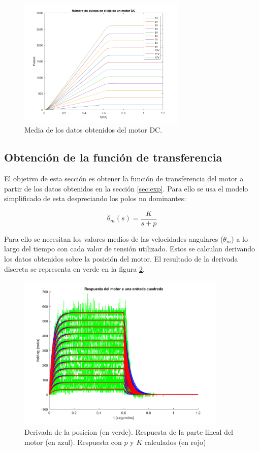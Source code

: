 \documentclass[a4paper]{article}
\begin{document}
\begin{figure}[hbp]
	\begin{center}
		\includegraphics[width=8cm]{n_pulsos}
		\caption{Media de los datos obtenidos del motor DC.}
		\label{datos}
	\end{center}
\end{figure}

\subsection{Obtención de la función de transferencia}
El objetivo de esta sección es obtener la función de transferencia del motor a partir de los datos obtenidos en la sección \ref{sec:exp}.
Para ello se usa el modelo simplificado de esta despreciando los polos no dominantes:

\begin{equation}
	\label{eq:trans}
	\dot{\theta}_m (s) = \frac{K}{s+p}
\end{equation}


Para ello se necesitan los valores medios de las velocidades angulares ($\dot{\theta}_m$) a lo largo del tiempo con cada valor de tensión utilizado.
Estos se calculan derivando los datos obtenidos sobre la posición del motor. El resultado de la derivada discreta se representa en verde en la figura \ref{velAng}.

\begin{figure}[htbp]
	\begin{center}

		\includegraphics[width=10cm]{vel_ang}
		\caption{Derivada de la posicion (en verde). Respuesta de la parte lineal del motor (en azul). Respuesta con $p$ y $K$ calculados (en rojo)}
		\label{velAng}
	\end{center}
\end{figure}
\end{document}
